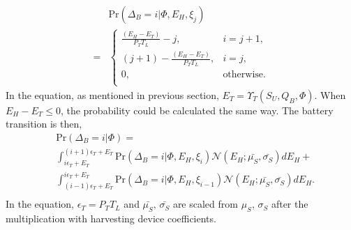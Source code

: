 \documentclass[conference]{IEEEtran}
\begin{document}
\begin{align}&\mbox{Pr}\left(\Delta_B = i |\Phi, E_H, \xi_j \right)\nonumber\\
=&\begin{cases} \frac{\left(E_H - E_T\right)}{P_TT_L} -j, &\mbox{$i = j + 1$},\\
\left(j+1\right) -\frac{\left(E_H - E_T\right)} {P_TT_L}, &\mbox{$i = j$},\\
0, &\mbox{otherwise.}\\
\end{cases}
\end{align}
In the equation, as mentioned in previous section, \(E_T = \Upsilon_T(S_U, Q_B, \Phi)\).
When \(E_H - E_T \le 0\), the probability could be calculated the same way.
The battery transition is then,
\begin{equation}\label{battery}
\begin{aligned}
	&\mbox{Pr}\left(\Delta_B = i |\Phi\right) = \\
	&\int\nolimits_{i\epsilon_T + E_T}^{\left(i+1\right)\epsilon_T+ E_T}
	\mbox{Pr}\left(\Delta_B = i |\Phi, E_H, \xi_i\right) \mathcal{N}\left(E_H;\bar{\mu_S},\bar{\sigma_S}\right) dE_H+\\
	& \int_{\left(i-1\right)\epsilon_T+ E_T}^{i\epsilon_T + E_T}
	\mbox{Pr}\left(\Delta_B = i |\Phi, E_H, \xi_{i-1}\right) \mathcal{N}\left(E_H;\bar{\mu_S},\bar{\sigma_S}\right) dE_H.\\
\end{aligned}
\end{equation}
In the equation, \(\epsilon_T = P_TT_L\) and \(\bar{\mu_S},\,\bar{\sigma_S}\) 
are scaled from \(\mu_S,\,\sigma_S\) after the multiplication with harvesting device coefficients.
\end{document}
